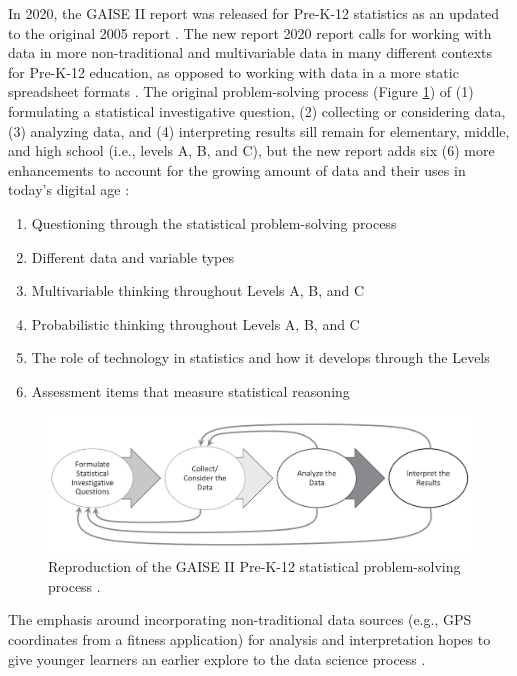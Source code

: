 \documentclass[010-intro.tex]{subfiles}
\begin{document}
    In 2020, the GAISE II report was released for Pre-K-12 statistics as an updated to the original 2005 report
    \cite{gaise2k12}.
    The new report 2020 report calls for working with data in more non-traditional and multivariable data in
    many different contexts for Pre-K-12 education, as opposed to working with data in a more static spreadsheet
    formats
    \cite{gaise2k12}.
    The original problem-solving process (Figure \ref{fig:gaisek-12}) of
    (1) formulating a statistical investigative question,
    (2) collecting or considering data,
    (3) analyzing data, and
    (4) interpreting results
    sill remain for elementary, middle, and high school (i.e., levels A, B, and C),
    but the new report adds six (6) more enhancements to account for the growing amount of
    data and their uses in today's digital age \cite{gaise2k12}:

    \begin{enumerate}
        \item Questioning through the statistical problem-solving process
        \item Different data and variable types
        \item Multivariable thinking throughout Levels A, B, and C
        \item Probabilistic thinking throughout Levels A, B, and C
        \item The role of technology in statistics and how it develops through the Levels
        \item Assessment items that measure statistical reasoning
    \end{enumerate}

    \begin{figure}[!hbtp]
        \centering
        \includegraphics[width=\textwidth]{figs/050-intro/gaise2-stat_problem_solving_process.png}
        \caption[GAISE II Pre-K-12 Statistical Problem-Solving Process]{
        Reproduction of the GAISE II Pre-K-12 statistical problem-solving process \cite{gaise2k12}.
        }
        \label{fig:gaisek-12}
    \end{figure}

    The emphasis around incorporating non-traditional data sources
    (e.g., GPS coordinates from a fitness application)
    for analysis and interpretation
    hopes to give younger learners an earlier explore to the data science process
    \cite{gaise2k12}.
\end{document}
